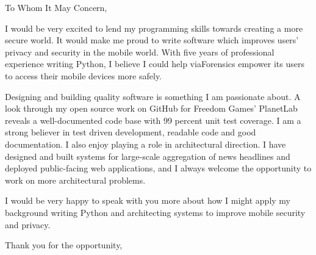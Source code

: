 
\signature{Walter Askew\\
1220 N Washtenaw Apt 3R\\
Chicago, IL 60622}

\begin{letter}{}

\opening{To Whom It May Concern,}

I would be very excited to lend my programming skills towards creating
a more secure world.  It would make me proud to write software which
improves users' privacy and security in the mobile world.  With five
years of professional experience writing Python, I believe I could
help viaForensics empower its users to access their mobile devices
more safely.

Designing and building quality software is something I am passionate
about.  A look through my open source work on GitHub for Freedom
Games' PlanetLab reveals a well-documented code base with 99 percent
unit test coverage.  I am a strong believer in test driven
development, readable code and good documentation.  I also enjoy
playing a role in architectural direction.  I have designed and built
systems for large-scale aggregation of news headlines and deployed
public-facing web applications, and I always welcome the opportunity
to work on more architectural problems.

I would be very happy to speak with you more about how I might apply
my background writing Python and architecting systems to improve
mobile security and privacy.

\closing{Thank you for the opportunity,}
\end{letter}

